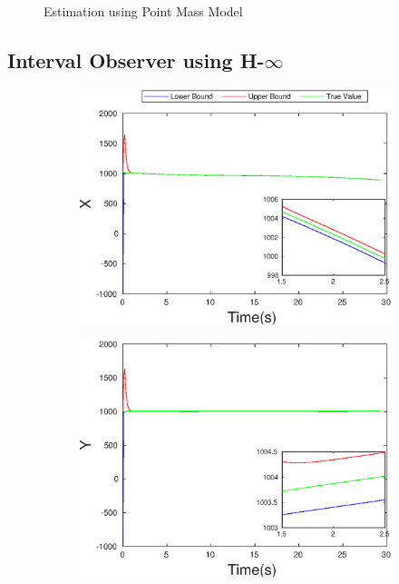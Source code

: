 \begin{figure}[h]
\begin{subfigure}{.5\linewidth}
\end{subfigure}
\caption{Estimation using Point Mass Model}
\end{figure}


\clearpage
\subsection{Interval Observer using H-$\infty$}
\FloatBarrier
\begin{figure}[h]
\begin{subfigure}{.5\linewidth}
\centering
\includegraphics[width=.9\linewidth]{figures/HInf/s3cvHInfX}
\end{subfigure}
\begin{subfigure}{.5\linewidth}
\centering
\includegraphics[width=.9\linewidth]{figures/HInf/s3cvHInfY}
\end{subfigure}
\begin{subfigure}{.5\linewidth}

\end{subfigure}
\end{figure}
